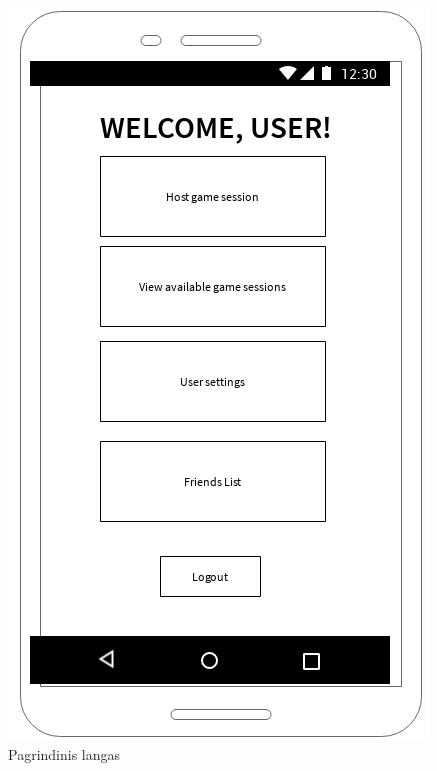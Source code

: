 \documentclass{VUMIFPSkursinis}
\begin{document}
\begin{figure}[H]
	\centering
	\includegraphics[scale=0.9]{img/main_window}
	\caption{Pagrindinis langas}
	\label{img:main_window}
\end{figure}
\end{document}
